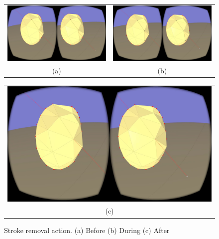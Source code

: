\begin{figure}[!h]
    \centering
    \setlength{\tabcolsep}{0.0130\linewidth}
    \begin{tabular}{@{}cc@{}}
    \includegraphics[width=0.45\linewidth]{figures/pre_remove} &
       	\includegraphics[width=0.45\linewidth]{figures/during_remove} \\
       	(a)&(b)\\
       	\end{tabular}
       	
       	  \centering
    \setlength{\tabcolsep}{0.0130\linewidth}
    \begin{tabular}{@{}c@{}}
    \includegraphics[width=0.926\linewidth]{figures/post_remove}\\
    (c)
    \end{tabular}
    
   
    \caption[Stroke removal action]{Stroke removal action.
    	  \textup{(a)} Before \textup{(b)} During \textup{(c)} After
      \label{fig:remove_example}}
\end{figure}

